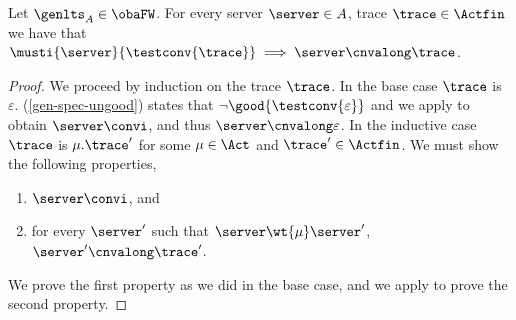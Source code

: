 \begin{lemma}
  \label{lem:must-cnv}
  Let $\genlts_A \in \obaFW$. For every server $\server \in \States$, trace $\trace \in \Actfin$
  we have that
  $\musti{\server}{\testconv{\trace}} \implies \server \cnvalong \trace$.
\end{lemma}
\begin{proof}
  We proceed by induction on the trace $\trace$.
  In the base case $\trace$ is $\varepsilon$.
  (\ref{gen-spec-ungood}) states that
  $\lnot \good{\testconv{\varepsilon}}$ and we apply  to obtain $\server \convi$,
  and thus $\server \cnvalong \varepsilon$.
  In the inductive case $\trace$ is $\mu.\trace'$ for some $\mu \in \Act$ and $\trace' \in \Actfin$.
  We must show the following properties,
  \begin{enumerate}
  \item $\server \convi$, and
  \item for every $\server'$ such that $\server \wt{\mu} \server'$, $\server' \cnvalong \trace'$.
  \end{enumerate}
  We prove the first property as we did in the base case,
  and we apply  to prove the second property.
\end{proof}

